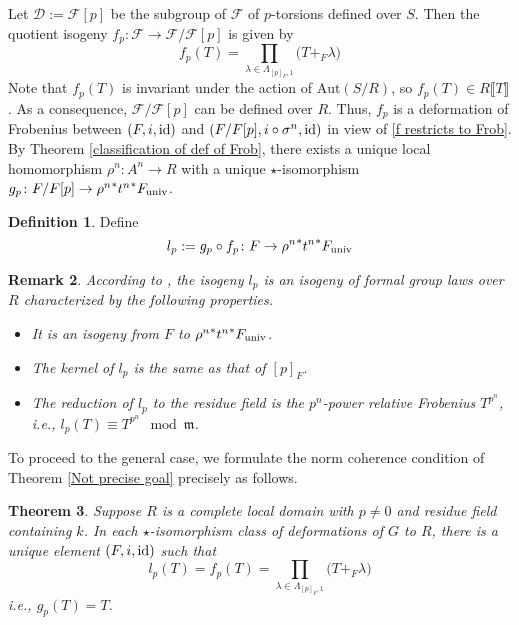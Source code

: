 \documentclass[12pt]{article}
\newtheorem{theorem}{Theorem}[section]
\newtheorem{remark}[theorem]{Remark}
\theoremstyle{definition}
\newtheorem{definition}[theorem]{Definition}
\newcommand{\PS}[1]{\llbracket #1 \rrbracket}
\def\m{\mathfrak{m}}
\begin{document}
    Let $\mathcal{D} := \mathcal{F}[p]$ be the subgroup of $\mathcal{F}$ of $p$-torsions defined over $S$. Then the quotient isogeny $f_p \colon \mathcal{F} \to \mathcal{F}/\mathcal{F}[p]$ is given by 
    \begin{equation*}
        f_p(T) = \prod_{\lambda \in \Lambda_{[p]_F,1}}\bigl(T +_F \lambda\bigr)
    \end{equation*}
    Note that $f_p(T)$ is invariant under the action of $\mbox{Aut}(S/R)$, so $f_p(T) \in R\PS{T}$. As a consequence, $\mathcal{F}/\mathcal{F}[p]$ can be defined over $R$. Thus, $f_p$ is a deformation of Frobenius between $(F,i,\rm{id})$ and $(F/F[p],i \circ \sigma^n,\rm{id})$ in view of \eqref{f restricts to Frob}. By Theorem \ref{classification of def of Frob}, there exists a unique local homomorphism $\rho^n \colon A^n \to R$ with a unique $\star$-isomorphism $g_p \colon F/F[p] \to {\rho^n}^*{t^n}^*F_{\rm univ}$. 
    \begin{definition}
        Define 
        \begin{equation*}
            l_p := g_p \circ f_p \colon F \to {\rho^n}^*{t^n}^*F_{\rm univ}
        \end{equation*}
    \end{definition}
    \begin{remark} \label{Classification of l_p}
        According to \cite[Remark 6.7]{Zhu20}, the isogeny $l_p$ is an isogeny of formal group laws over $R$ characterized by the following properties. 
        \begin{itemize}
            \item [(a)] It is an isogeny from $F$ to ${\rho^n}^*{t^n}^*F_{\rm univ}$. 
            \item [(b)] The kernel of $l_p$ is the same as that of $[p]_F$. 
            \item [(c)] The reduction of $l_p$ to the residue field is the $p^n$-power relative Frobenius $T^{p^n}$, i.e., $l_p(T) \equiv T^{p^n} \mod{\m}$. 
        \end{itemize}
    \end{remark}
    To proceed to the general case, we formulate the norm coherence condition of Theorem \ref{Not precise goal} precisely as follows. 
    \begin{theorem} \label{Goal}
        Suppose $R$ is a complete local domain with $p \neq 0$ and residue field containing $k$. In each $\star$-isomorphism class of deformations of $G$ to $R$, there is a unique element $(F,i,{\rm id})$ such that 
        \begin{equation} \label{Generalized Ando's criterion}
            l_p(T) = f_p(T) = \prod_{\lambda \in \Lambda_{[p]_F,1}}\bigl(T +_F \lambda\bigr)
        \end{equation}
        i.e., $g_p(T) = T$. 
    \end{theorem}
\end{document}
